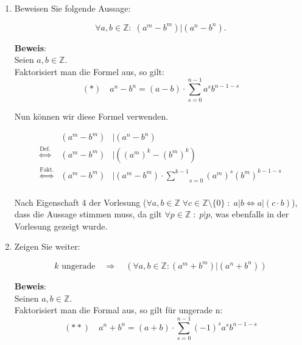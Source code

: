 \documentclass[11pt,a4paper,ngerman]{article}
\newcommand{\Z}{\mathbb{Z}}
\begin{document}
\begin{enumerate}[\bfseries a)]

\item Beweisen Sie folgende Aussage:

$$\forall a,b \in \Z : \; (a^m - b^m) | (a^n - b^n).$$



\textbf{Beweis}: \\
Seien $a,b\in \Z$.\\
Faktorisiert man die Formel aus, so gilt:\\
$$(*) \quad a^n - b^n = \left( a - b \right) \cdot \sum_{s=0}^{n-1} a^s b^{n-1-s}$$

Nun können wir diese Formel verwenden.

$$\begin{array}{crl}
&\left(a^m - b^m \right)&|\left( a^n - b^n \right) \\
\stackrel{\text{Def.}}{\Leftrightarrow} & \left( a^m - b^m \right) &| \left( \left( a^m \right) ^k - \left( b^m \right)^k \right)\\ 
\stackrel{\text{Fakt.}}{\Leftrightarrow} &  \left( a^m - b^m \right) &| \left( a^m - b^m \right) \cdot \underset{s=0}{\overset{k-1}{\sum}} \left( a^m \right)^s \left( b^m \right)^{k-1-s}\\
\end{array}$$

Nach Eigenschaft 4 der Vorlesung ($\forall a,b \in \Z\;\forall c \in \Z \setminus \{0\} \; : \; a|b \Leftrightarrow a|(c \cdot b)$), dass die Aussage stimmen muss, da gilt $\forall p \in \Z \; : \; p | p$, was ebenfalls in der Vorlesung gezeigt wurde.

\item Zeigen Sie weiter:

$$ k \text{ ungerade} \quad \Rightarrow \quad (\forall a,b \in \Z : (a^m + b^m) | (a^n + b^n))$$


\textbf{Beweis}: \\
Seinen $a,b\in \Z$.\\
Faktorisiert man die Formal aus, so gilt für ungerade n:
$$(**) \quad a^n + b^n = (a + b) \cdot \sum_{s = 0}^{n - 1} (-1)^s a^sb^{n-1-s}$$


\end{enumerate}
\end{document}
